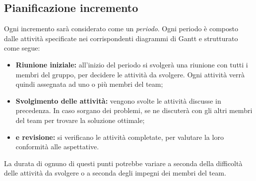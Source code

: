 \subsection{Pianificazione incremento}
Ogni incremento sarà considerato come un \textit{periodo}. Ogni periodo è composto dalle attività specificate nei corrispondenti diagrammi di Gantt e strutturato come segue:
\begin{itemize}
\item \textbf{Riunione iniziale:} all'inizio del periodo si svolgerà una riunione con tutti i membri del gruppo, per decidere le attività da svolgere. Ogni attività verrà quindi assegnata ad uno o più membri del team;
\item \textbf{Svolgimento delle attività:} vengono svolte le attività discusse in precedenza. In caso sorgano dei problemi, se ne discuterà con gli altri membri del team per trovare la soluzione ottimale;
\item \textbf{ e revisione:} si verificano le attività completate, per valutare la loro conformità alle aspettative.
\end{itemize}
La durata di ognuno di questi punti potrebbe variare a seconda della difficoltà delle attività da svolgere o a seconda degli impegni dei membri del team.
\newpage
